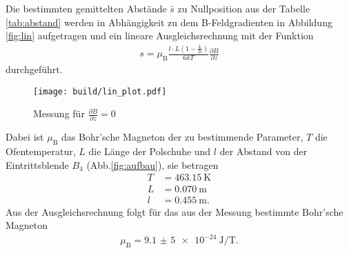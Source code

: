 Die bestimmten gemittelten Abstände $\bar{s}$ zu Nullposition
aus der Tabelle \ref{tab:abstand}
werden in Abhängigkeit zu dem B-Feldgradienten in Abbildung
\ref{fig:lin} aufgetragen und ein lineare Ausgleichsrechnung mit der Funktion
\begin{align}
s=\mu_{\mathrm{B}}\frac{l\cdot L\left(1-\frac{L}{2l}\right)}{6 k T}\frac{\partial B}{\partial z}
\end{align}
durchgeführt.
\begin{figure}
  \centering
  \texttt{[image: build/lin\_plot.pdf]}
  \caption{Messung für $\frac{\partial B}{\partial z}=0$ }
  \label{fig:mess0}
\end{figure}

Dabei ist $\mu_{\mathrm{B}}$ das Bohr'sche Magneton der zu bestimmende Parameter, $T$ die Ofentemperatur,
$L$ die Länge der Polschuhe und $l$ der Abstand von der Eintrittsblende $B_4$ (Abb.\ref{fig:aufbau}),
sie betragen
\begin{align}
  T&=\SI{463,15}{\kelvin}\\
  L&=\SI{0,070}{\meter}\\
  l&=\SI{0,455}{\meter}.
\end{align}
Aus der Ausgleichsrechnung folgt für das aus der Messung bestimmte
Bohr'sche Magneton
\begin{align}
\mu_{\mathrm{B}}=\SI{9,1(5) e-24}{\joule\per\tesla }.
\end{align}
